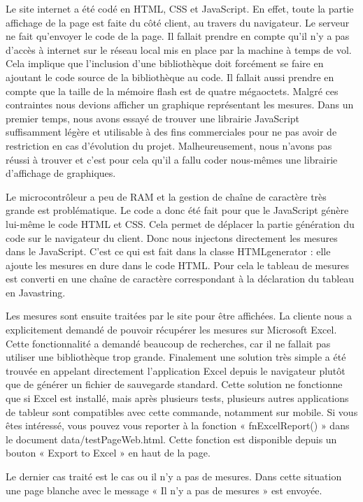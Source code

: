 Le site internet a été codé en HTML, CSS et JavaScript. En effet, toute la partie affichage de la page est faite du côté client, au travers du navigateur. Le serveur ne fait qu'envoyer le code de la page. Il fallait prendre en compte qu'il n'y a pas d'accès à internet sur le réseau local mis en place par la machine à temps de vol. Cela implique que l'inclusion d'une bibliothèque doit forcément se faire en ajoutant le code source de la bibliothèque au code. Il fallait aussi prendre en compte que la taille de la mémoire flash est de quatre mégaoctets. Malgré ces contraintes nous devions afficher un graphique représentant les mesures. Dans un premier temps, nous avons essayé de trouver une librairie JavaScript suffisamment légère et utilisable à des fins commerciales pour ne pas avoir de restriction en cas d'évolution du projet. Malheureusement, nous n'avons pas réussi à trouver et c'est pour cela qu'il a fallu coder nous-mêmes une librairie d'affichage de graphiques.

Le microcontrôleur a peu de RAM et la gestion de chaîne de caractère très grande est problématique. Le code a donc été fait pour que le JavaScript génère lui-même le code HTML et CSS. Cela permet de déplacer la partie génération du code sur le navigateur du client. Donc nous injectons directement les mesures dans le JavaScript. C'est ce qui est fait dans la classe HTMLgenerator : elle ajoute les mesures en dure dans le code HTML. Pour cela le tableau de mesures est converti en une chaîne de caractère correspondant à la déclaration du tableau en Javastring.

Les mesures sont ensuite traitées par le site pour être affichées. La cliente nous a explicitement demandé de pouvoir récupérer les mesures sur Microsoft Excel. Cette fonctionnalité a demandé beaucoup de recherches, car il ne fallait pas utiliser une bibliothèque trop grande. Finalement une solution très simple a été trouvée en appelant directement l'application Excel depuis le navigateur plutôt que de générer un fichier de sauvegarde standard. Cette solution ne fonctionne que si Excel est installé, mais après plusieurs tests, plusieurs autres applications de tableur sont compatibles avec cette commande, notamment sur mobile. Si vous êtes intéressé, vous pouvez vous reporter à la fonction « fnExcelReport() » dans le document data/testPageWeb.html. Cette fonction est disponible depuis un bouton « Export to Excel » en haut de la page.

Le dernier cas traité est le cas ou il n'y a pas de mesures. Dans cette situation une page blanche avec le message « Il n'y a pas de mesures » est envoyée.

